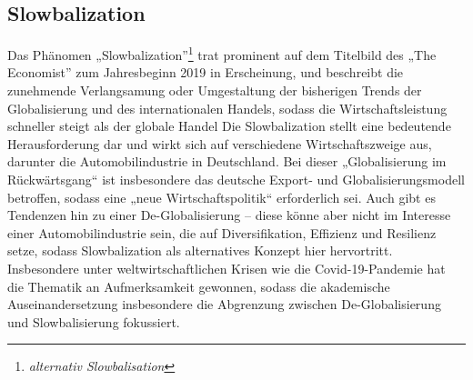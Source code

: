 \documentclass[12pt,a4paper,oneside]{book} %
\begin{document}
	\subsection{Slowbalization}
	Das Phänomen „Slowbalization”\footnote{\textit{alternativ Slowbalisation}} trat prominent auf dem Titelbild des „The Economist” zum Jahresbeginn 2019\autocite{economist_slowbalisation_2019} in Erscheinung, und beschreibt die zunehmende Verlangsamung oder Umgestaltung der bisherigen Trends der Globalisierung und des internationalen Handels, sodass die Wirtschaftsleistung schneller steigt als der globale Handel%
	Die Slowbalization stellt eine bedeutende Herausforderung dar und wirkt sich auf verschiedene Wirtschaftszweige aus, darunter die Automobilindustrie in Deutschland. Bei dieser „Globalisierung im Rückwärtsgang“ ist insbesondere das deutsche Export- und Globalisierungsmodell betroffen, sodass eine „neue Wirtschaftspolitik“ erforderlich sei.\autocite{maier_globalisierung_2019} Auch gibt es Tendenzen hin zu einer De-Globalisierung – diese könne aber nicht im Interesse einer Automobilindustrie sein, die auf Diversifikation, Effizienz und Resilienz setze,\autocite{rade_globalisierung_2022} sodass Slowbalization als alternatives Konzept hier hervortritt. Insbesondere unter weltwirtschaftlichen Krisen wie die Covid-19-Pandemie hat die Thematik an Aufmerksamkeit gewonnen, sodass die akademische Auseinandersetzung insbesondere die Abgrenzung zwischen De-Globalisierung und Slowbalisierung fokussiert.\autocites{dalla_longa_urban_2023}{inferrera_globalisation_2021}
	
	
\end{document}
